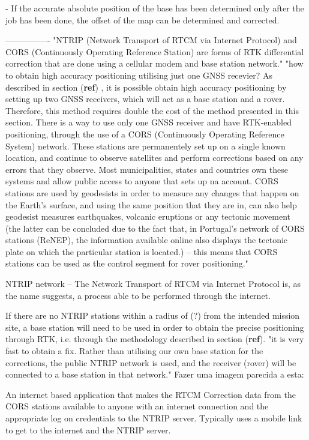 - If the accurate absolute position of the base has been determined only after the job has been done, the offset of the map can be determined and corrected.

----------------
"NTRIP (Network Transport of RTCM via Internet Protocol) and CORS (Continuously Operating Reference Station) are forms of RTK differential correction that are done using a cellular modem and base station network."
"how to obtain high accuracy positioning utilising just one GNSS recevier?
As described in section (\textbf{ref}) , it is possible obtain high accuracy positioning by setting up two GNSS receivers, which will act as a base station and a rover. Therefore, this method requires double the cost of the method presented in this section. There is a way to use only one GNSS receiver and have RTK-enabled positioning, through the use of a CORS (Continuously Operating Reference System) network. These stations are permanentely set up on a single known location, and continue to observe satellites and perform corrections based on any errors that they observe. Most municipalities, states and countries own these systems and allow public access to anyone that sets up na account. CORS stations are used by geodesists in order to measure any changes that happen on the Earth's surface, and using the same position that they are in, can also help geodesist measures earthquakes, volcanic eruptions or any tectonic movement (the latter can be concluded due to the fact that, in Portugal's network of CORS stations (ReNEP), the information available online also displays the tectonic plate on which the particular station is located.) -- this means that CORS stations can be used as the control segment for rover positioning."


NTRIP network -- The Network Transport of RTCM via Internet Protocol is, as the name suggests, a process able to be performed through the internet.

If there are no NTRIP stations within a radius of (?) from the intended mission site, a base station will need to be used in order to obtain the precise positioning through RTK, i.e. through the methodology described in section (\textbf{ref}).
"it is very fast to obtain a fix. Rather than utilising our own base station for the corrections, the public NTRIP network is used, and the receiver (rover) will be connected to a base station in that network."
Fazer uma imagem parecida a esta: %

An internet based application that makes the RTCM Correction data from the CORS stations available to anyone with an internet connection and the appropriate log on credentials to the NTRIP server. Typically uses a mobile link to get to the internet and the NTRIP server. %



